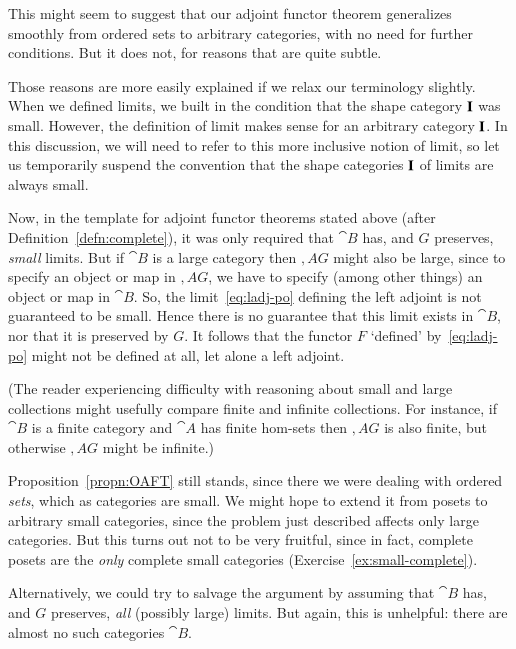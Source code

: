 This might seem to suggest that our adjoint functor theorem generalizes
smoothly from ordered sets to arbitrary categories, with no need for
further conditions.  But it does not, for reasons that are quite subtle.

Those reasons are more easily explained if we relax our terminology
slightly.  When we defined limits, we built in the condition that the shape
category $\mathbf{I}$ was small.%
%
%
%
However, the definition of limit makes sense for an arbitrary category
$\mathbf{I}$.  In this discussion, we will need to refer to this more
inclusive notion of limit, so let us temporarily suspend the convention
that the shape categories $\mathbf{I}$ of limits are always small.

Now, in the template for adjoint functor theorems stated above (after
Definition~\ref{defn:complete}), it was only required that $\cat{B}$ has, and
$G$ preserves, \emph{small} limits.  But if $\cat{B}$ is a large category
then $\comma{A}{G}$ might also be large, since to specify an object or map in
$\comma{A}{G}$, we have to specify (among other things) an object or map in
$\cat{B}$.  So, the limit~\eqref{eq:ladj-po} defining the left adjoint is not
guaranteed to be small.  Hence there is no guarantee that this limit exists in
$\cat{B}$, nor that it is preserved by $G$.  It follows that the functor $F$
`defined' by~\eqref{eq:ladj-po} might not be defined at all, let alone a left
adjoint.

(The reader experiencing difficulty with reasoning about small and large
collections might usefully compare finite and infinite collections.  For
instance, if $\cat{B}$ is a finite category and $\cat{A}$ has finite
hom-sets then $\comma{A}{G}$ is also finite, but otherwise $\comma{A}{G}$
might be infinite.)

Proposition~\ref{propn:OAFT} still stands, since there we were dealing with
ordered \emph{sets}, which as categories are small.  We might hope to
extend it from posets to arbitrary small categories, since the problem just
described affects only large categories.  But this turns out not to be very
fruitful, since in fact, complete posets are the \emph{only}%
%
%
complete small categories (Exercise~\ref{ex:small-complete}).%
%
%

Alternatively, we could try to salvage the argument by assuming that
$\cat{B}$ has, and $G$ preserves, \emph{all} (possibly large) limits.  But
again, this is unhelpful: there are almost no such categories $\cat{B}$.

